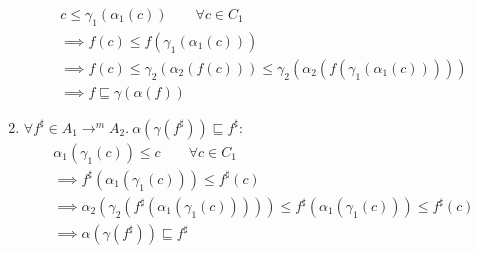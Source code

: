 \begin{exercise}
\begin{enumerate}[1.]
\begin{gather*}
            c \leq \gamma_1 (\alpha_1 (c)) \qquad \forall c \in C_1 \\
            \implies f(c) \leq f(\gamma_1 (\alpha_1 (c))) \\
            \implies f(c) \leq \gamma_2(\alpha_2(f(c))) \leq \gamma_2(\alpha_2(f(\gamma_1 (\alpha_1 (c))))) \\
            \implies f \sqsubseteq \gamma(\alpha(f))
        \end{gather*}
        \item $\forall f^\sharp \in A_1 \to^m A_2.\ \alpha(\gamma(f^\sharp)) \sqsubseteq f^\sharp$:
        \begin{gather*}
            \alpha_1(\gamma_1(c)) \leq c \qquad \forall c \in C_1 \\
            \implies f^\sharp(\alpha_1(\gamma_1(c))) \leq f^\sharp(c) \\
            \implies \alpha_2(\gamma_2(f^\sharp(\alpha_1(\gamma_1(c))))) \leq f^\sharp(\alpha_1(\gamma_1(c))) \leq f^\sharp(c) \\
            \implies \alpha(\gamma(f^\sharp)) \sqsubseteq f^\sharp
        \end{gather*}
    \end{enumerate}
\end{exercise}
